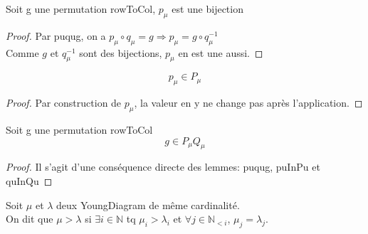 \begin{lemma}[bijpu]
    \label{bijpu}
    \leanok
    Soit g une permutation rowToCol, $p_{\mu}$ est une bijection
\end{lemma}
\begin{proof}
    \leanok
    Par puqug, on a $p_{\mu} \circ q_{\mu} = g \Rightarrow p_{\mu} = g \circ q_{\mu}^{-1}$\\
    Comme $g$ et $q_{\mu}^{-1}$ sont des bijections, $p_{\mu}$ en est une aussi.
\end{proof}

\begin{lemma}[puInPu]
    \label{puInPu}
    \leanok
    \[ p_{\mu} \in P_{\mu} \]
\end{lemma}
\begin{proof}
    \leanok
    Par construction de $p_{\mu}$, la valeur en y ne change pas après l'application.
\end{proof}

\begin{lemma}[gInPuQu]
    \label{gInPuQu}
    \leanok
    Soit g une permutation rowToCol
    \[g \in P_{\mu}Q_{\mu}\]
\end{lemma}
\begin{proof}
    \leanok
    Il s'agit d'une conséquence directe des lemmes: puqug, puInPu et quInQu
\end{proof}

\begin{definition}[IneqYoungDiagram]
    \label{IneqYoungDiagram}
    \leanok
    Soit $\mu$ et $\lambda$ deux YoungDiagram de même cardinalité.\\
    On dit que $\mu > \lambda$ si $\exists i \in \mathbb{N}$ tq $\mu_{i}>\lambda_{i}$ et $\forall j \in \mathbb{N}_{<i}$, $\mu_{j} = \lambda_{j}$.
\end{definition}